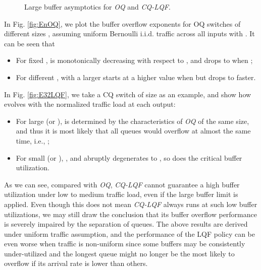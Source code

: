 \documentclass[journal,final,doublecolumn,10pt,twoside]{IEEEtranTCOM} \normalsize
\begin{document}
\begin{figure}[ht]
\centering
\begin{minipage}[t]{3.2 in}
\centering {}
\end{minipage}
\begin{minipage}[t]{3.2 in}
\centering {}
\end{minipage}
\caption{Large buffer asymptotics for \emph{OQ} and \emph{CQ-LQF}.}
\label{fig:pooling}
\end{figure}

In Fig. \ref{fig:EnOQ}, we plot the buffer overflow exponents  for OQ switches of different sizes , assuming uniform Bernoulli i.i.d. traffic across all inputs with . It can be seen that
\begin{itemize}
\item For fixed ,  is monotonically decreasing with respect to , and drops to  when ;

\item For different ,  with a larger  starts at a higher value when   but drops to  faster.
\end{itemize}

In Fig. \ref{fig:E32LQF}, we take a CQ switch of size  as an example, and show how  evolves with the normalized traffic load  at each output:
\begin{itemize}
\item For large  (or ),  is determined by the characteristics of \emph{OQ} of the same size, and thus it is most likely that all queues would overflow at almost the same time, i.e., ;

\item For small  (or ), , and  abruptly degenerates to , so does the critical buffer utilization.
\end{itemize}

As we can see, compared with \emph{OQ}, \emph{CQ-LQF} cannot guarantee a high buffer utilization under low to medium traffic load, even if the large buffer limit is applied. Even though this does not mean \emph{CQ-LQF} always runs at such low buffer utilizations, we may still draw the conclusion that its buffer overflow performance is severely impaired by the separation of queues. The above results are derived under uniform traffic assumption, and the performance of the LQF policy can be even worse when traffic is non-uniform since some buffers may be consistently under-utilized and the longest queue might no longer be the most likely to overflow if its arrival rate is lower than others.
\end{document}
